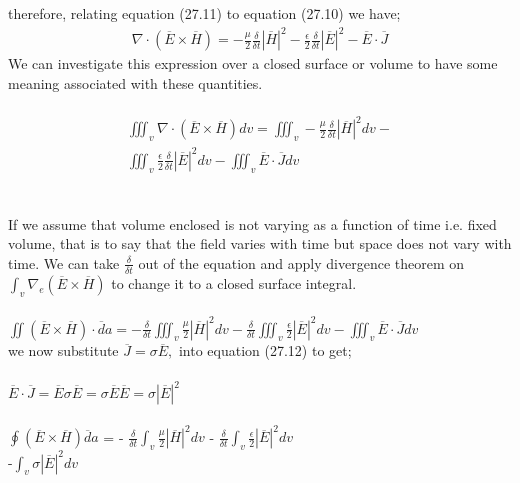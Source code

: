 therefore, relating equation (27.11) to equation (27.10) we have;
\begin{align}
\nabla\cdot(\overline{E}\times\overline{H})=-\frac{\mu}{2}\frac{\delta}{\delta t}|\overline{H}|^{2} -  \frac{\epsilon}{2}\frac{\delta}{\delta t}|\overline{E}|^{2}-\overline{E}\cdot\overline{J} \end{align}
We can investigate this expression over a closed surface or volume to have some meaning associated with these quantities.\\\\
\begin{align*}
\iiint_{v}\nabla\cdot(\overline{E}\times\overline{H})dv  = \iiint_v-\frac{\mu}{2}\frac{\delta}{\delta t}|\overline{H}|^{2}dv-\\ \iiint_{v}\frac{\epsilon}{2}\frac{\delta}{\delta t}|\overline{E}|^{2}dv -\iiint_{v}\overline{E}\cdot\overline{J}dv 
\end{align*}\\\\
If we assume that volume enclosed is not varying as a function of time i.e. fixed volume, that is to say that  the field varies with time but space does not vary with time. We can take $\frac{\delta}{\delta t}$ out of the equation and apply divergence theorem on $ \int_{v}\nabla_{e}(\overline{E}\times\overline{H}) $ to change it to a closed surface integral.\\\\
\begin{math}
\iint(\overline{E}\times\overline{H})\cdot\overline{d}a  =  -\frac{\delta}{\delta t}  \iiint_{v}\frac{\mu}{2}|\overline{H}|^{2}dv -  \frac{\delta}{\delta t}\iiint_{v}\frac{\epsilon}{2}|\overline{E}|^{2}dv  -  \iiint_{v}\overline{E}\cdot\overline{J}dv 
\end{math}\\
we now substitute $ \overline{J}=\sigma\overline{E}, $ into equation (27.12) to get; \\\\
$\overline{E}\cdot\overline{J}=\overline{E}\sigma\overline{E}=\sigma\overline{E}\overline{E}=\sigma|\overline{E}|^{2} $\\\\
$ \oint(\overline{E}\times\overline{H})\overline{d}a $ = - $ \frac{\delta}{\delta t}\int_{v} \frac{\mu}{2}|\overline{H}|^{2}dv$ - $ \frac{\delta}{\delta t}\int_{v}\frac{\epsilon}{2}|\overline{E}|^{2}dv$\\
-$ \int_{v}\sigma|\overline{E}|^{2}dv $
\\
\\
